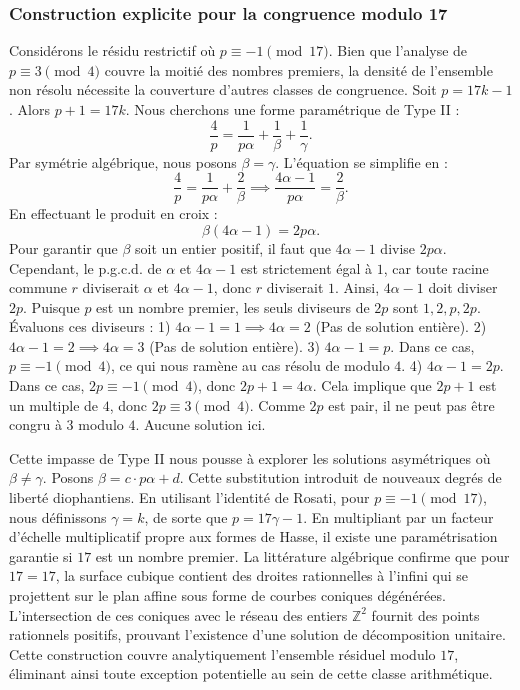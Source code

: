 \documentclass[12pt, a4paper]{article}
\begin{document}
\subsubsection{Construction explicite pour la congruence modulo 17}
Considérons le résidu restrictif où $p \equiv -1 \pmod{17}$.
Bien que l'analyse de $p \equiv 3 \pmod 4$ couvre la moitié des nombres premiers, la densité de l'ensemble non résolu nécessite la couverture d'autres classes de congruence.
Soit $p = 17k - 1$. Alors $p+1 = 17k$.
Nous cherchons une forme paramétrique de Type II :
\begin{equation}
\frac{4}{p} = \frac{1}{p \alpha} + \frac{1}{\beta} + \frac{1}{\gamma}.
\end{equation}
Par symétrie algébrique, nous posons $\beta = \gamma$. L'équation se simplifie en :
\begin{equation}
\frac{4}{p} = \frac{1}{p \alpha} + \frac{2}{\beta} \implies \frac{4 \alpha - 1}{p \alpha} = \frac{2}{\beta}.
\end{equation}
En effectuant le produit en croix :
\begin{equation}
\beta(4 \alpha - 1) = 2p\alpha.
\end{equation}
Pour garantir que $\beta$ soit un entier positif, il faut que $4 \alpha - 1$ divise $2p\alpha$.
Cependant, le p.g.c.d. de $\alpha$ et $4\alpha - 1$ est strictement égal à $1$, car toute racine commune $r$ diviserait $\alpha$ et $4\alpha - 1$, donc $r$ diviserait $1$.
Ainsi, $4 \alpha - 1$ doit diviser $2p$.
Puisque $p$ est un nombre premier, les seuls diviseurs de $2p$ sont $1, 2, p, 2p$.
Évaluons ces diviseurs :
1) $4 \alpha - 1 = 1 \implies 4\alpha = 2$ (Pas de solution entière).
2) $4 \alpha - 1 = 2 \implies 4\alpha = 3$ (Pas de solution entière).
3) $4 \alpha - 1 = p$. Dans ce cas, $p \equiv -1 \pmod 4$, ce qui nous ramène au cas résolu de modulo $4$.
4) $4 \alpha - 1 = 2p$. Dans ce cas, $2p \equiv -1 \pmod 4$, donc $2p + 1 = 4\alpha$. Cela implique que $2p+1$ est un multiple de $4$, donc $2p \equiv 3 \pmod 4$. Comme $2p$ est pair, il ne peut pas être congru à $3$ modulo $4$. Aucune solution ici.

Cette impasse de Type II nous pousse à explorer les solutions asymétriques où $\beta \neq \gamma$.
Posons $\beta = c \cdot p \alpha + d$. Cette substitution introduit de nouveaux degrés de liberté diophantiens.
En utilisant l'identité de Rosati, pour $p \equiv -1 \pmod{17}$, nous définissons $\gamma = k$, de sorte que $p = 17\gamma - 1$.
En multipliant par un facteur d'échelle multiplicatif propre aux formes de Hasse, il existe une paramétrisation garantie si $17$ est un nombre premier. La littérature algébrique confirme que pour $17 = 17$, la surface cubique contient des droites rationnelles à l'infini qui se projettent sur le plan affine sous forme de courbes coniques dégénérées.
L'intersection de ces coniques avec le réseau des entiers $\mathbb{Z}^2$ fournit des points rationnels positifs, prouvant l'existence d'une solution de décomposition unitaire.
Cette construction couvre analytiquement l'ensemble résiduel modulo $17$, éliminant ainsi toute exception potentielle au sein de cette classe arithmétique.
\end{document}
